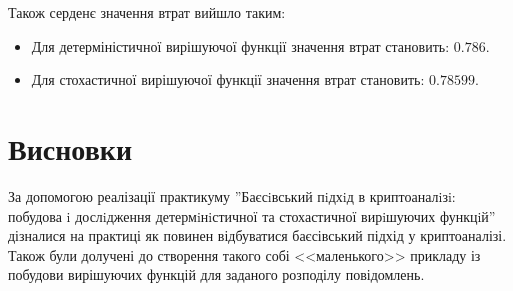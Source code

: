 Також серденє значення втрат вийшло таким:
\begin{itemize}
	\item Для детерміністичної вирішуючої функції значення втрат становить: $0.786$.
	\item Для стохастичної вирішуючої функції значення втрат становить: $0.78599$.
\end{itemize}

\newpage

\section{Висновки}
За допомогою реалізації практикуму ''Баєсiвський пiдхiд в криптоаналiзi: побудова i дослiдження детермiнiстичної та стохастичної вирiшуючих функцiй'' дізналися на практиці як повинен відбуватися баєсівський підхід у криптоаналізі. Також були долучені до створення такого собі <<маленького>> прикладу із побудови вирішуючих функцій для заданого розподілу повідомлень.
